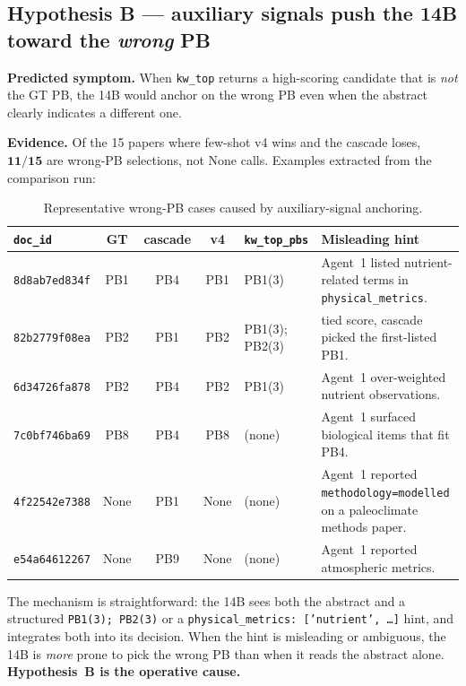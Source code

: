 \documentclass[11pt,a4paper]{article}
\begin{document}
\subsection{Hypothesis B --- auxiliary signals push the 14B toward the \emph{wrong} PB}

\textbf{Predicted symptom.} When \texttt{kw\_top} returns a high-scoring candidate that is \emph{not} the GT PB, the 14B would anchor on the wrong PB even when the abstract clearly indicates a different one.

\textbf{Evidence.} Of the 15 papers where few-shot v4 wins and the cascade loses, $\mathbf{11/15}$ are wrong-PB selections, not None calls. Examples extracted from the comparison run:

\begin{table}[H]
\centering
\caption{Representative wrong-PB cases caused by auxiliary-signal anchoring.}
\label{tab:wrongpb}
\begin{tabularx}{\textwidth}{lcccll}
\toprule
\texttt{doc\_id} & GT & cascade & v4 & \texttt{kw\_top\_pbs} & Misleading hint \\
\midrule
\texttt{8d8ab7ed834f} & PB1 & PB4 & PB1 & PB1(3) & Agent~1 listed nutrient-related terms in \texttt{physical\_metrics}. \\
\texttt{82b2779f08ea} & PB2 & PB1 & PB2 & PB1(3); PB2(3) & tied score, cascade picked the first-listed PB1. \\
\texttt{6d34726fa878} & PB2 & PB4 & PB2 & PB1(3) & Agent~1 over-weighted nutrient observations. \\
\texttt{7c0bf746ba69} & PB8 & PB4 & PB8 & (none) & Agent~1 surfaced biological items that fit PB4. \\
\texttt{4f22542e7388} & None & PB1 & None & (none) & Agent~1 reported \texttt{methodology=modelled} on a paleoclimate methods paper. \\
\texttt{e54a64612267} & None & PB9 & None & (none) & Agent~1 reported atmospheric metrics. \\
\bottomrule
\end{tabularx}
\end{table}

The mechanism is straightforward: the 14B sees both the abstract and a structured \texttt{PB1(3); PB2(3)} or a \texttt{physical\_metrics: ['nutrient', \dots]} hint, and integrates both into its decision. When the hint is misleading or ambiguous, the 14B is \emph{more} prone to pick the wrong PB than when it reads the abstract alone. \textbf{Hypothesis~B is the operative cause.}
\end{document}
